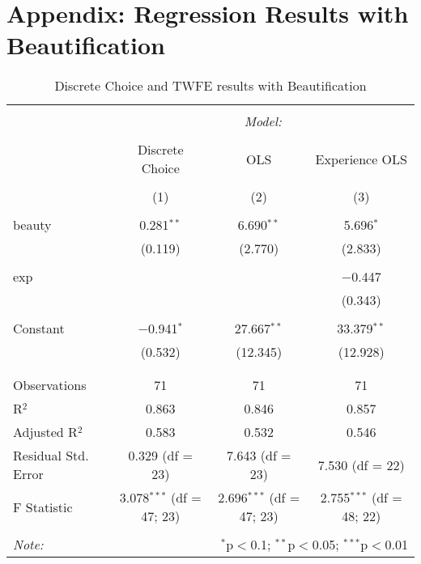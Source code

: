 \section*{Appendix: Regression Results with Beautification}

\begin{table}[H] \centering 
  \caption{Discrete Choice and TWFE results with Beautification} 
  \label{} 
\begin{tabular}{lccc} 
\\[-1.8ex]\hline 
\hline \\[-1.8ex] 
 & \multicolumn{3}{c}{\textit{Model:}} \\ 
\cline{2-4} 
\\[-1.8ex] & Discrete Choice & OLS & Experience OLS \\ 
\\[-1.8ex] & (1) & (2) & (3)\\ 
\hline \\[-1.8ex] 
 beauty & 0.281$^{**}$ & 6.690$^{**}$ & 5.696$^{*}$ \\ 
  & (0.119) & (2.770) & (2.833) \\ 
  & & & \\ 
 exp &  &  & $-$0.447 \\ 
  &  &  & (0.343) \\ 
  & & & \\ 
 Constant & $-$0.941$^{*}$ & 27.667$^{**}$ & 33.379$^{**}$ \\ 
  & (0.532) & (12.345) & (12.928) \\ 
  & & & \\ 
\hline \\[-1.8ex] 
Observations & 71 & 71 & 71 \\ 
R$^{2}$ & 0.863 & 0.846 & 0.857 \\ 
Adjusted R$^{2}$ & 0.583 & 0.532 & 0.546 \\ 
Residual Std. Error & 0.329 (df = 23) & 7.643 (df = 23) & 7.530 (df = 22) \\ 
F Statistic & 3.078$^{***}$ (df = 47; 23) & 2.696$^{***}$ (df = 47; 23) & 2.755$^{***}$ (df = 48; 22) \\ 
\hline 
\hline \\[-1.8ex] 
\textit{Note:}  & \multicolumn{3}{r}{$^{*}$p$<$0.1; $^{**}$p$<$0.05; $^{***}$p$<$0.01} \\ 
\end{tabular} 
\end{table} 


